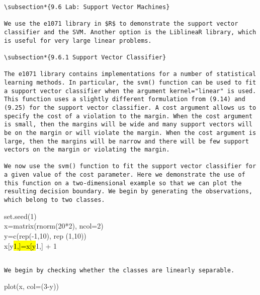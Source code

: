 \documentclass[10pt]{article}
\begin{document}
\begin{verbatim}
\subsection*{9.6 Lab: Support Vector Machines}

We use the e1071 library in $R$ to demonstrate the support vector classifier and the SVM. Another option is the LiblineaR library, which is useful for very large linear problems.

\subsection*{9.6.1 Support Vector Classifier}

The e1071 library contains implementations for a number of statistical learning methods. In particular, the svm() function can be used to fit a support vector classifier when the argument kernel="linear" is used. This function uses a slightly different formulation from (9.14) and (9.25) for the support vector classifier. A cost argument allows us to specify the cost of a violation to the margin. When the cost argument is small, then the margins will be wide and many support vectors will be on the margin or will violate the margin. When the cost argument is large, then the margins will be narrow and there will be few support vectors on the margin or violating the margin.

We now use the svm() function to fit the support vector classifier for a given value of the cost parameter. Here we demonstrate the use of this function on a two-dimensional example so that we can plot the resulting decision boundary. We begin by generating the observations, which belong to two classes.
\end{verbatim}

\begin{displayquote}
set.seed(1)\\
x=matrix(rnorm(20*2), ncol=2)\\
y=c(rep(-1,10), rep (1,10))\\
x[y\hl{1,]=x[y}1,] + 1
\end{displayquote}

\begin{verbatim}

We begin by checking whether the classes are linearly separable.
\end{verbatim}

\begin{displayquote}
plot(x, col=(3-y))
\end{displayquote}
\end{document}
